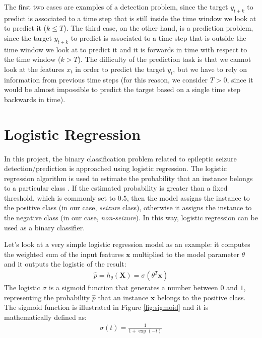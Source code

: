 The first two cases are examples of a detection problem, since the target $y_{t+k}$ to predict is associated to a time step that is still inside the time window we look at to predict it ($k \leq T$). The third case, on the other hand, is a prediction problem, since the target $y_{t+k}$ to predict is associated to a time step that is outside the time window we look at to predict it and it is forwards in time with respect to the time window ($k > T$). The difficulty of the prediction task is that we cannot look at the features $x_t$ in order to predict the target $y_t$, but we have to rely on information from previous time steps (for this reason, we consider $T>0$, since it would be almost impossible to predict the target based on a single time step backwards in time).


\section{Logistic Regression} \label{sec: logistic_regression}
\paragraph{} In this project, the binary classification problem related to epileptic seizure detection/prediction is approached using logistic regression. The logistic regression algorithm is used to estimate the probability that an instance belongs to a particular class \cite{OReilly:handsonML}. If the estimated probability is greater than a fixed threshold, which is commonly set to $0.5$, then the model assigns the instance to the positive class (in our case, \textit{seizure} class), otherwise it assigns the instance to the negative class (in our case, \textit{non-seizure}). In this way, logistic regression can be used as a binary classifier.

Let's look at a very simple logistic regression model as an example: it computes the weighted sum of the input features $\mathbf{x}$ multiplied to the model parameter $\theta$ and it outputs the logistic of the result:
\begin{align}
    \hat{p} = h_{\theta}(\mathbf{X}) = \sigma\left(\theta^T \mathbf{x}\right)
\end{align}
The logistic $\sigma$ is a sigmoid function that generates a number between $0$ and $1$, representing the probability $\hat{p}$ that an instance $\mathbf{x}$ belongs to the positive class. The sigmoid function is illustrated in Figure \ref{fig:sigmoid} and it is mathematically defined as:
\begin{align}
    \sigma(t) = \frac{1}{1 + \exp{(-t)}}
\end{align}


